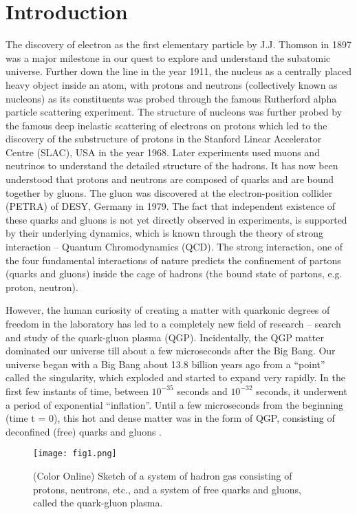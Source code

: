 \documentclass[showpacs,showkeys,aps,twocolumn]{revtex4}
\newcommand\+{\dagger}
\begin{document}
\section{Introduction}
\label{intro}
The discovery of electron as the first elementary particle by J.J. Thomson in 1897 was a major milestone in our quest to explore and understand the subatomic universe. Further down the line in the year 1911, the nucleus as a centrally placed heavy object inside an atom, with protons and neutrons (collectively known as nucleons) as its constituents was probed through the famous Rutherford alpha particle scattering experiment. The structure of nucleons was further probed by the famous deep inelastic scattering of electrons on protons which led to the discovery of the substructure of protons in the Stanford Linear Accelerator Centre (SLAC), USA in the year 1968. Later experiments used muons and neutrinos to understand the detailed structure of the hadrons. It has now been understood that protons and neutrons are composed of quarks and are bound together by gluons. The gluon was discovered at the electron-position collider (PETRA) of DESY, Germany in 1979. The fact that independent existence of these quarks and gluons is not yet directly observed in experiments, is supported by their underlying dynamics, which is known through the theory of strong interaction -- Quantum Chromodynamics (QCD). The strong interaction, one of the four fundamental interactions of nature predicts the confinement of partons (quarks and gluons) inside the cage of hadrons (the bound state of partons, e.g. proton, neutron).

However, the human curiosity of creating a matter with quarkonic degrees of freedom in the laboratory has led to a completely new field of research – search and study of the quark-gluon plasma (QGP). Incidentally, the QGP matter dominated our universe till about a few microseconds after the Big Bang. Our universe began with a Big Bang about 13.8 billion years \cite{Ref0} ago from a “point” called the singularity, which exploded and started to expand very rapidly. In the first few instants of time, between $10^{-35}$ seconds and $10^{-32}$ seconds, it underwent a period of exponential “inflation”. Until a few microseconds from the beginning (time t = 0), this hot and dense matter was in the form of QGP, consisting of deconfined (free) quarks and gluons \cite{Ref1,Ref2}. 

\begin{figure}[ht]
\texttt{[image: fig1.png]}
\caption[]{(Color Online) Sketch of a system of hadron gas consisting of protons, neutrons, etc., and a system of free quarks and gluons, called the quark-gluon plasma.}
\label{fig1}
\end{figure}
\end{document}
